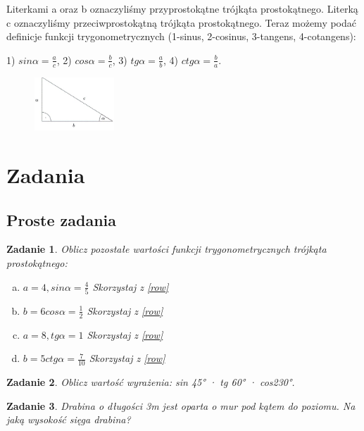 \documentclass[12pt,a4paper]{article}
\newtheorem{zad}{Zadanie}[section]
\begin{document}
Literkami a oraz b oznaczyliśmy przyprostokątne trójkąta prostokątnego.
Literką c oznaczyliśmy przeciwprostokątną trójkąta prostokątnego.
Teraz możemy podać definicje funkcji trygonometrycznych (1-sinus, 2-cosinus, 3-tangens, 4-cotangens):

\begin{center}
\label{row}
1) $sinα=\frac{a}{c}$,
\label{row}
2) $cosα=\frac{b}{c}$,
\label{row}
3) $tgα=\frac{a}{b}$,
\label{row}
4) $ctgα=\frac{b}{a}$.

\end{center}

\cite{od1}

\begin{figure}
\includegraphics[width=3cm, angle=25]{troj}
\end{figure}


\newpage
\section{Zadania}

\subsection{Proste zadania}

\begin{zad}
Oblicz pozostałe wartości funkcji trygonometrycznych trójkąta prostokątnego:

\begin{enumerate}[a)]
\item $a=4 , sinα=\frac{4}{5}$ Skorzystaj z \ref{row}
\item $b=6 cosα=\frac{1}{2}$   Skorzystaj z \ref{row}
\item $a=8 ,tgα=1$             Skorzystaj z \ref{row}  
\item $b=5 ctgα=\frac{7}{10}$  Skorzystaj z \ref{row}
\end{enumerate}

\end{zad}

\begin{zad}
Oblicz wartość wyrażenia: sin 45° · tg 60° · cos230°.
\end{zad}

\begin{zad}
Drabina o długości 3m jest oparta o mur pod kątem  do poziomu. Na jaką wysokość sięga drabina?
\end{zad}
\end{document}
